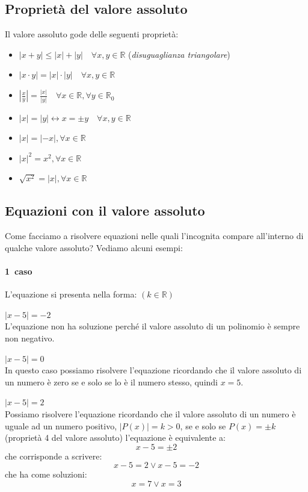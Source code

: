 \subsection{Proprietà del valore assoluto}
Il valore assoluto gode delle seguenti proprietà:
\begin{itemize}
        \item \(|x+y|\leq |x|+|y| \quad \forall x,y \in \mathbb{R}\) \quad (\emph{disuguaglianza triangolare})
        \item \(|x\cdot y|=|x|\cdot |y| \quad  \forall x,y \in \mathbb{R}\)
        \item \(\left|\frac{x}{y} \right| =\frac{|x|}{|y|} \quad \forall x \in \mathbb{R}, 
\forall y \in \mathbb{R}_0\)
        \item \(|x|=|y| \longleftrightarrow x=\pm y \quad  \forall x,y \in \mathbb{R}\)
        \item \(|x|=|-x|, \forall x \in \mathbb{R}\)
        \item \(|x|^2=x^2, \forall x \in \mathbb{R}\)
        \item \(\sqrt{x^2}=|x|, \forall x \in \mathbb{R}\)
\end{itemize}

\subsection{Equazioni con il valore assoluto}
Come facciamo a risolvere equazioni nelle quali l'incognita compare all'interno 
di qualche valore assoluto? Vediamo alcuni esempi:
\paragraph{1\textdegree~caso} L'equazione si presenta nella forma:  
 \quad \((k\in \mathbb{R})\)
\begin{esempio} 
\(|x-5|=-2\) \\[4pt]
L'equazione non ha soluzione perché il valore assoluto di un polinomio è sempre non negativo.
\end{esempio}
\begin{esempio}  
\(|x-5|=0\) \\[4pt]
In questo caso possiamo risolvere l'equazione ricordando che il valore assoluto di un numero è zero se e solo se 
lo è il numero stesso, quindi \(x=5\).
\end{esempio}
\begin{esempio}  
\(|x-5|=2\) \\[4pt]
Possiamo risolvere l'equazione ricordando che  il valore assoluto di un numero è uguale 
ad un numero positivo, \(|P(x)|=k>0\), se e solo se \(P(x)=\pm k\) (proprietà 4 del 
valore assoluto) l'equazione è equivalente a:
\[x-5=\pm 2\]
che corrisponde a scrivere:
\[x-5= 2 \vee x-5=-2\]
che ha come soluzioni:
\[x=7 \vee x=3\]
\end{esempio}


